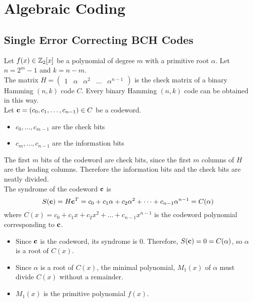 \section{Algebraic Coding}
\subsection{Single Error Correcting BCH Codes}
Let \(f(x) \in \mathbb{Z}_2[x]\) be a polynomial of degree \(m\) with a primitive root \(\alpha\). Let \(n = 2^m - 1\) and \(k = n - m\). \\

The matrix \(H = \begin{pmatrix}
    1 & \alpha & \alpha^2 & \dots & \alpha^{n - 1}
\end{pmatrix}\)
is the check matrix of a binary Hamming \((n, k)\) code \(C\). Every binary Hamming \((n, k)\) code can be obtained in this way. \\

Let \(\mathbf{c} = (c_0, c_1, \dots, c_{n - 1}) \in C\) be a codeword.
\begin{itemize}
    \item \(c_0, \dots, c_{m - 1}\) are the check bits
    \item \(c_m, \dots, c_{n - 1}\) are the information bits
\end{itemize}

The first \(m\) bits of the codeword are check bits, since the first \(m\) columns of \(H\) are the leading columns. Therefore the information bits and the check bits are neatly divided. \\

The syndrome of the codeword \(\mathbf{c}\) is
\[S(\mathbf{c}) = H\mathbf{c}^T = c_0 + c_1 \alpha + c_2 \alpha^2 + \dots + c_{n - 1}\alpha^{n - 1} = C(\alpha)\]
where \(C(x) = c_0 + c_1 x + c_2 x^2 + \dots + c_{n - 1}x^{n - 1}\) is the codeword polynomial corresponding to \(\mathbf{c}\).
\begin{itemize}
    \item Since \(\mathbf{c}\) is the codeword, its syndrome is 0. Therefore, \(S(\mathbf{c}) = 0 = C(\alpha)\), so \(\alpha\) is a root of \(C(x)\).
    \item Since \(\alpha\) is a root of \(C(x)\), the minimal polynomial, \(M_1(x)\) of \(\alpha\) must divide \(C(x)\) without a remainder.
    \item \(M_1(x)\) is the primitive polynomial \(f(x)\).
\end{itemize}

